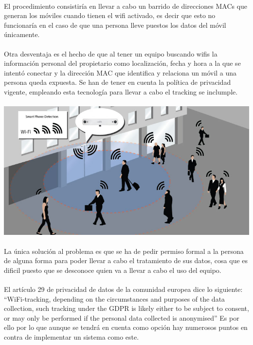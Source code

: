 \documentclass[a4paper ,12pt, onecolumn]{article}
\begin{document}
            \paragraph{}
            El procedimiento consistiría en llevar a cabo un barrido de direcciones MACs que generan los móviles cuando tienen el wifi activado,
            es decir que esto no funcionaría en el caso de que una persona lleve puestos los datos del móvil únicamente.
            \paragraph{}
            Otra desventaja es el hecho de que al tener un equipo buscando wifis la información personal del propietario como localización,
            fecha y hora a la que se intentó conectar y la dirección MAC que identifica y relaciona un móvil a una persona queda expuesta.
            Se han de tener en cuenta la política de privacidad vigente, empleando esta tecnología para llevar a cabo el tracking se inclumple.
            \paragraph{}
            \includegraphics[scale=0.4]{WifiCounting.jpg}
            \paragraph{}
            La única solución al problema es que se ha de pedir permiso formal a la persona de alguna forma para poder llevar a cabo
            el tratamiento de sus datos, cosa que es dificil puesto que se desconoce quien va a llevar a cabo el uso del equipo.
            \paragraph{}
            El artículo 29 de privacidad de datos de la comunidad europea dice lo siguiente:
            “WiFi-tracking, depending on the circumstances and purposes of the data collection, such tracking under the GDPR is likely
            either to be subject to consent, or may only be performed if the personal data collected is anonymised”
            Es por ello por lo que aunque se tendrá en cuenta como opción hay numerosos puntos en contra de implementar un sistema como este.
\end{document}
